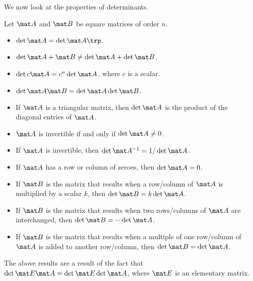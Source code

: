We now look at the properties of determinants.

\begin{fact}
    Let $\mat A$ and $\mat B$ be square matrices of order $n$.
    \begin{itemize}
        \item $\det{\mat A} = \det{\mat A \trp}$.
        \item $\det{\mat A + \mat B} \neq \det{\mat A} + \det{\mat B}$.
        \item $\det{c \mat A} = c^n \det{\mat A}$, where $c$ is a scalar.
        \item $\det{\mat A \mat B} = \det{\mat A} \det{\mat B}$.
        \item If $\mat A$ is a triangular matrix, then $\det{\mat A}$ is the product of the diagonal entries of $\mat A$.
        \item $\mat A$ is invertible if and only if $\det{\mat A} \neq 0$.
        \item If $\mat A$ is invertible, then $\det{\mat A^{-1}} = 1/\det{\mat A}$.
        \item If $\mat A$ has a row or column of zeroes, then $\det{\mat A} = 0$.
    \end{itemize}
\end{fact}

\begin{fact}
    \phantom{.}
    \begin{itemize}
        \item If $\mat B$ is the matrix that results when a row/column of $\mat A$ is multiplied by a scalar $k$, then $\det{\mat B} = k \det{\mat A}$.
        \item If $\mat B$ is the matrix that results when two rows/columns of $\mat A$ are interchanged, then $\det{\mat B} = -\det{\mat A}$.
        \item If $\mat B$ is the matrix that results when a multiple of one row/column of $\mat A$ is added to another row/column, then $\det{\mat B} = \det{\mat A}$.
    \end{itemize}
\end{fact}

The above results are a result of the fact that $\det{\mat E \mat A} = \det{\mat E}\det{\mat A}$, where $\mat E$ is an elementary matrix.